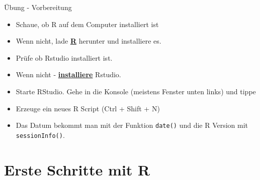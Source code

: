 \documentclass[ignorenonframetext,]{beamer}
\begin{document}
\begin{frame}[fragile]{Übung - Vorbereitung}

\begin{itemize}
\item
  Schaue, ob R auf dem Computer installiert ist
\item
  Wenn nicht, lade \href{r-project.org}{\textbf{R}} herunter und
  installiere es.
\item
  Prüfe ob Rstudio installiert ist.
\item
  Wenn nicht - \href{http://www.rstudio.com/}{\textbf{installiere}}
  Rstudio.
\item
  Starte RStudio. Gehe in die Konsole (meistens Fenster unten links) und
  tippe
\item
  Erzeuge ein neues R Script (Ctrl + Shift + N)
\item
  Das Datum bekommt man mit der Funktion \texttt{date()} und die R
  Version mit \texttt{sessionInfo()}.
\end{itemize}

\end{frame}

\section{Erste Schritte mit R}\label{erste-schritte-mit-r}
\end{document}
